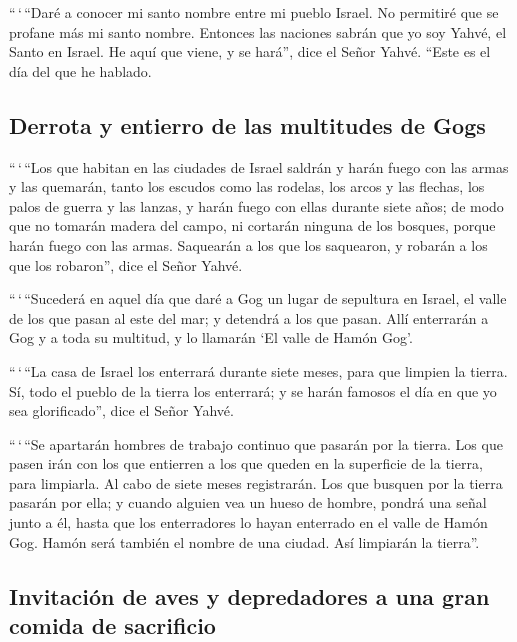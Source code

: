 \begin{paracol}{2}
 ``\,`\,``Daré a conocer mi santo nombre entre mi pueblo
Israel. No permitiré que se profane más mi santo nombre. Entonces las
naciones sabrán que yo soy Yahvé, el Santo en Israel.  He
aquí que viene, y se hará'', dice el Señor Yahvé. ``Este es el día del
que he hablado.

\hypertarget{derrota-y-entierro-de-las-multitudes-de-gogs}{%
\subsection{Derrota y entierro de las multitudes de
Gogs}\label{derrota-y-entierro-de-las-multitudes-de-gogs}}

 ``\,`\,``Los que habitan en las ciudades de Israel
saldrán y harán fuego con las armas y las quemarán, tanto los escudos
como las rodelas, los arcos y las flechas, los palos de guerra y las
lanzas, y harán fuego con ellas durante siete años;  de
modo que no tomarán madera del campo, ni cortarán ninguna de los
bosques, porque harán fuego con las armas. Saquearán a los que los
saquearon, y robarán a los que los robaron'', dice el Señor Yahvé.

 ``\,`\,``Sucederá en aquel día que daré a Gog un lugar
de sepultura en Israel, el valle de los que pasan al este del mar; y
detendrá a los que pasan. Allí enterrarán a Gog y a toda su multitud, y
lo llamarán `El valle de Hamón Gog'.

 ``\,`\,``La casa de Israel los enterrará durante siete
meses, para que limpien la tierra.  Sí, todo el pueblo de
la tierra los enterrará; y se harán famosos el día en que yo sea
glorificado'', dice el Señor Yahvé.

 ``\,`\,``Se apartarán hombres de trabajo continuo que
pasarán por la tierra. Los que pasen irán con los que entierren a los
que queden en la superficie de la tierra, para limpiarla. Al cabo de
siete meses registrarán.  Los que busquen por la tierra
pasarán por ella; y cuando alguien vea un hueso de hombre, pondrá una
señal junto a él, hasta que los enterradores lo hayan enterrado en el
valle de Hamón Gog.  Hamón será también el nombre de una
ciudad. Así limpiarán la tierra''.

\hypertarget{invitaciuxf3n-de-aves-y-depredadores-a-una-gran-comida-de-sacrificio}{%
\subsection{Invitación de aves y depredadores a una gran comida de
sacrificio}\label{invitaciuxf3n-de-aves-y-depredadores-a-una-gran-comida-de-sacrificio}}


\end{paracol}
